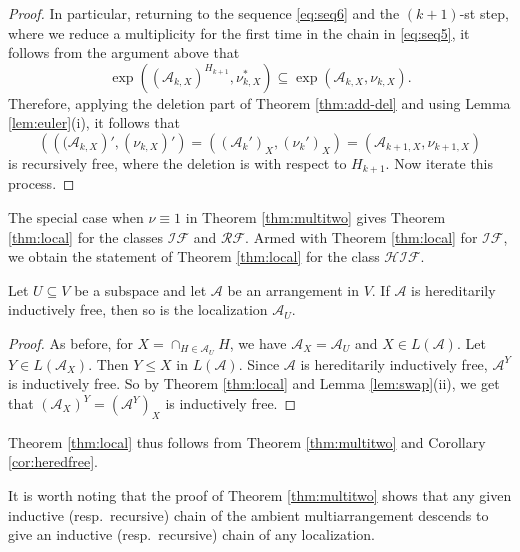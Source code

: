 \begin{proof}
In particular, returning to the sequence \eqref{eq:seq6} and 
the $(k+1)$-st step, 
where we reduce a multiplicity 
for the first time in the chain in \eqref{eq:seq5}, 
it follows from the argument above that 
\[
\exp (({{\mathcal A}}_{k,X})^{H_{k+1}}, \nu_{k,X}^*)  \subseteq 
\exp ({{\mathcal A}}_{k,X}, \nu_{k,X}).
\]
Therefore, applying the deletion part of Theorem \ref{thm:add-del} and 
using Lemma \ref{lem:euler}(i), it follows that 
\[
\left(\left(({{\mathcal A}}_{k,X}\right)', (\nu_{k,X})'\right)  = 
\left(({{\mathcal A}}_k')_X, (\nu_{k}')_X\right) = 
\left({{\mathcal A}}_{k+1, X}, \nu_{k+1,X}\right)
\]
is recursively free, where the deletion is with respect to 
$H_{k+1}$.
Now iterate this process. 
\end{proof}

The special case when 
$\nu \equiv 1$ in Theorem \ref{thm:multitwo} gives
Theorem \ref{thm:local}
for the classes ${{\mathcal {IF}}}$ and ${{\mathcal {RF}}}$.
Armed with 
Theorem \ref{thm:local} for ${{\mathcal {IF}}}$, we 
obtain the statement of 
Theorem \ref{thm:local} for the class ${{\mathcal {HIF}}}$.

\begin{corollary}
\label{cor:heredfree}
Let $U \subseteq V$ be a subspace and let 
${{\mathcal A}}$ be an arrangement in $V$.
If ${{\mathcal A}}$ is hereditarily  inductively free,
then so is the localization ${{\mathcal A}}_U$.
\end{corollary}

\begin{proof}
As before, for $X = \cap_{H \in {{\mathcal A}}_U} H$, we have 
${{\mathcal A}}_X = {{\mathcal A}}_U$ and $X \in L({{\mathcal A}})$. 
Let $Y \in L({{\mathcal A}}_X)$. Then $Y \le X$ in $L({{\mathcal A}})$.
Since ${{\mathcal A}}$ is hereditarily  inductively free,
${{\mathcal A}}^Y$ is inductively free.
So by Theorem \ref{thm:local}
and Lemma \ref{lem:swap}(ii), we get that
$({{\mathcal A}}_X)^Y = ({{\mathcal A}}^Y)_X$ is inductively free.
\end{proof}

Theorem \ref{thm:local} thus follows from 
Theorem \ref{thm:multitwo} and 
Corollary \ref{cor:heredfree}.

\begin{remark}
\label{rem:proof}
It is worth noting that the proof
of Theorem \ref{thm:multitwo} shows that any given 
inductive (resp.\ recursive) chain of the ambient 
multiarrangement descends to give an 
inductive (resp.\ recursive) chain of any 
localization. 
\end{remark}

